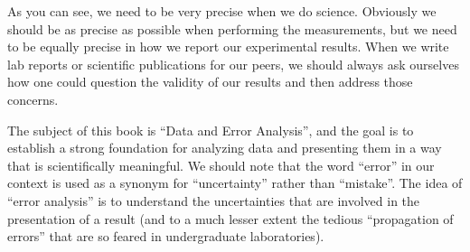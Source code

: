As you can see, we need to be very precise when we do science. Obviously we should be as precise as possible when performing the measurements, but we need to be equally precise in how we report our experimental results. When we write lab reports or scientific publications for our peers, we should always ask ourselves how one could question the validity of our results and then address those concerns.

The subject of this book is ``Data and Error Analysis'', and the goal is to establish a strong foundation for analyzing data and presenting them in a way that is scientifically meaningful. We should note that the word ``error'' in our context is used as a synonym for ``uncertainty'' rather than ``mistake''. The idea of ``error analysis'' is to understand the uncertainties that are involved in the presentation of a result (and to a much lesser extent the tedious ``propagation of errors'' that are so feared in undergraduate laboratories).

